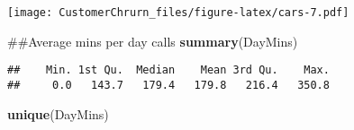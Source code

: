 \documentclass[]{article}
\newenvironment{Shaded}{\begin{snugshade}}{\end{snugshade}}
\newcommand{\KeywordTok}[1]{\textcolor[rgb]{0.13,0.29,0.53}{\textbf{#1}}}
\newcommand{\NormalTok}[1]{#1}
\begin{document}
\texttt{[image: CustomerChrurn\_files/figure-latex/cars-7.pdf]}

\begin{Shaded}
\begin{Highlighting}[]
\NormalTok{##Average mins per day calls}
\KeywordTok{summary}\NormalTok{(DayMins)}
\end{Highlighting}
\end{Shaded}

\begin{verbatim}
##    Min. 1st Qu.  Median    Mean 3rd Qu.    Max. 
##     0.0   143.7   179.4   179.8   216.4   350.8
\end{verbatim}

\begin{Shaded}
\begin{Highlighting}[]
\KeywordTok{unique}\NormalTok{(DayMins)}
\end{Highlighting}
\end{Shaded}
\end{document}
